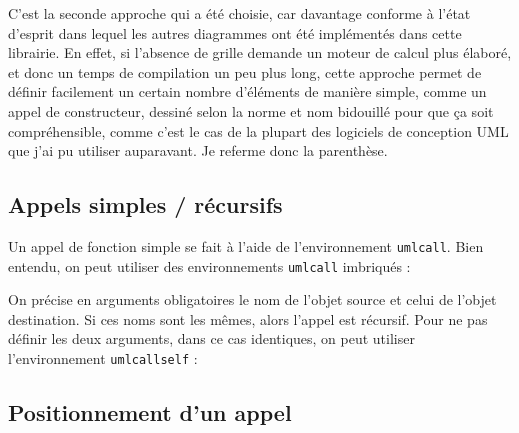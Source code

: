 \documentclass[a4paper,11pt]{report}
\newcommand{\inputTikZ}[1]{%
  }%
\newcommand{\inputTikZ}[1]{%
    \texttt{[image: fig/\#1.pdf]}%
  }%
\begin{document}
C'est la seconde approche qui a été choisie, car davantage conforme à l'état d'esprit dans lequel les autres diagrammes ont été implémentés dans cette librairie. En effet, si l'absence de grille demande un moteur de calcul plus élaboré, et donc un temps de compilation un peu plus long, cette approche permet de définir facilement un certain nombre d'éléments de manière simple, comme un appel de constructeur, dessiné selon la norme et nom \og bidouillé\fg{} pour que ça soit compréhensible, comme c'est le cas de la plupart des logiciels de conception UML que j'ai pu utiliser auparavant. Je referme donc la parenthèse.

\subsection{Appels simples / récursifs}\label{ss.call}

Un appel de fonction simple se fait à l'aide de l'environnement {\tt umlcall}. Bien entendu, on peut utiliser des environnements {\tt umlcall} imbriqués :

\medskip

\begin{minipage}{0.4\textwidth}

\end{minipage}
\begin{minipage}{0.6\textwidth}
\begin{center}
\inputTikZ{call}
\end{center}
\end{minipage}

\medskip

On précise en arguments obligatoires le nom de l'objet source et celui de l'objet destination.
Si ces noms sont les mêmes, alors l'appel est récursif. Pour ne pas définir les deux arguments, dans ce cas identiques, on peut utiliser l'environnement {\tt umlcallself} :

\medskip

\begin{minipage}{0.5\textwidth}

\end{minipage}
\begin{minipage}{0.5\textwidth}
\begin{center}
\inputTikZ{callself}
\end{center}
\end{minipage}

\subsection{Positionnement d'un appel}\label{ss.calldt}
\end{document}
